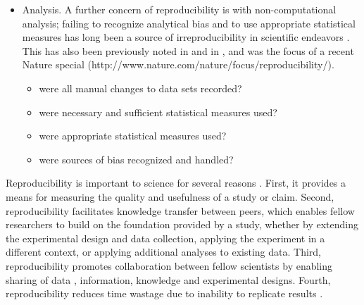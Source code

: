 \begin{itemize}
  \item Analysis.  A further concern of reproducibility is with 
  non-computational analysis; failing to recognize analytical bias and to 
  use appropriate statistical measures has long been a source of 
  irreproducibility in scientific endeavors \cite{sackett1979bias}.
  This has also been previously noted in \cite{ioannidis2005most} 
  and in \cite{nuzzo2014statistical, begley2013reproducibility}, 
  and was the focus of a recent Nature special 
  (http://www.nature.com/nature/focus/reproducibility/).
  \begin{itemize}
     \item were all manual changes to data sets recorded?
     \item were necessary and sufficient statistical measures used?
       \cite{pashler2012replicability}
     \item were appropriate statistical measures used? 
       \cite{vaux2012numbers}
     \item were sources of bias recognized and handled? 
       \cite{macarthur2012reproducibility, wagenmakers2012agenda}
  \end{itemize}

\end{itemize}

Reproducibility is important to science for several reasons 
\cite{borgman2012conundrum}.  First, it 
provides a means for measuring the quality and usefulness of a study or 
claim.  Second, reproducibility facilitates knowledge transfer between 
peers, which enables fellow researchers to build on the foundation provided 
by a study, whether by extending the experimental design and data collection, 
applying the experiment in a different context, or applying additional analyses 
to existing data.  Third, reproducibility promotes collaboration between fellow 
scientists by enabling sharing of data \cite{rung2013reuse}, 
information, knowledge and experimental 
designs.  Fourth, reproducibility reduces time wastage due to inability to 
replicate results 
\cite{ioannidis2005most, mullard2011reliability, prinz2011reproducibility,
begley2012drug}. 



